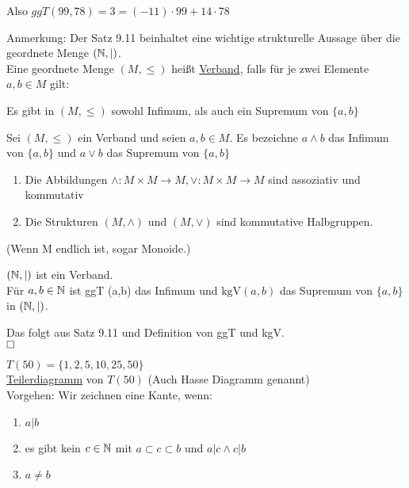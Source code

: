 \documentclass{../../meta/tudscript}
\begin{document}
		Also $ggT (99, 78) = 3 = (-11) \cdot 99 + 14 \cdot 78$

		Anmerkung: Der Satz 9.11 beinhaltet eine wichtige strukturelle Aussage über die geordnete Menge $(\mathbb{N}, |)$.\\

		Eine geordnete Menge $(M, \leq)$ heißt \underline{Verband}, falls für je zwei Elemente $a,b \in M$ gilt:

		Es gibt in $(M, \leq )$ sowohl Infimum, als auch ein Supremum von $\{a,b\}$

			Sei $(M, \leq )$ ein Verband und seien $a,b \in M$. Es bezeichne $a \wedge b$ das
			Infimum von $\{a,b\}$ und $a \vee b$ das Supremum von  $\{a,b\}$

			\begin{enumerate}
				\item Die Abbildungen $\wedge: M \times M \rightarrow M, \vee: M \times M \rightarrow M$ sind assoziativ und kommutativ
				\item Die Strukturen $(M, \wedge)$ und $(M, \vee)$ sind kommutative Halbgruppen.
			\end{enumerate}

			(Wenn M endlich ist, sogar Monoide.)


		$(\mathbb{N}, |)$ ist ein Verband.\\
		Für $a,b \in \mathbb{N}$ ist ggT (a,b) das Infimum und $\text{kgV}(a,b)$ das Supremum von $\{a,b\}$ in  $(\mathbb{N}, |)$.

				Das folgt aus Satz 9.11 und Definition von ggT und kgV.\\

				$\hfill\square$

		$T(50) = \{1, 2, 5, 10, 25, 50\}$\\
		\underline{Teilerdiagramm} von $T(50)$ (Auch Hasse Diagramm genannt)\\

		Vorgehen: Wir zeichnen eine Kante, wenn:
		\begin{enumerate}
			\item $a|b$
			\item es gibt kein $c \in \mathbb{N}$ mit $a\subset c \subset b$ und $a|c \land c|b$
			\item $a \neq b$
		\end{enumerate}

\end{document}
